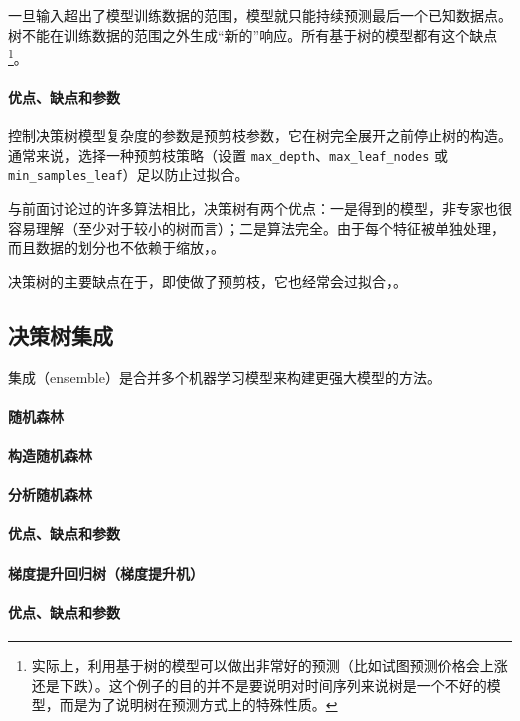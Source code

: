 
一旦输入超出了模型训练数据的范围，模型就只能持续预测最后一个已知数据点。树不能在训练数据的范围之外生成“新的”响应。所有基于树的模型都有这个缺点\footnote{实际上，利用基于树的模型可以做出非常好的预测（比如试图预测价格会上涨还是下跌）。这个例子的目的并不是要说明对时间序列来说树是一个不好的模型，而是为了说明树在预测方式上的特殊性质。}。

\paragraph{优点、缺点和参数} 控制决策树模型复杂度的参数是预剪枝参数，它在树完全展开之前停止树的构造。通常来说，选择一种预剪枝策略（设置 \verb|max_depth|、\verb|max_leaf_nodes| 或 \verb|min_samples_leaf|）足以防止过拟合。

与前面讨论过的许多算法相比，决策树有两个优点：一是得到的模型，非专家也很容易理解（至少对于较小的树而言）；二是算法完全。由于每个特征被单独处理，而且数据的划分也不依赖于缩放，。

决策树的主要缺点在于，即使做了预剪枝，它也经常会过拟合，。

\subsection{决策树集成}
集成（ensemble）是合并多个机器学习模型来构建更强大模型的方法。
\paragraph{随机森林}
\paragraph{构造随机森林}
\paragraph{分析随机森林}
\paragraph{优点、缺点和参数}
\paragraph{梯度提升回归树（梯度提升机）}
\paragraph{优点、缺点和参数}